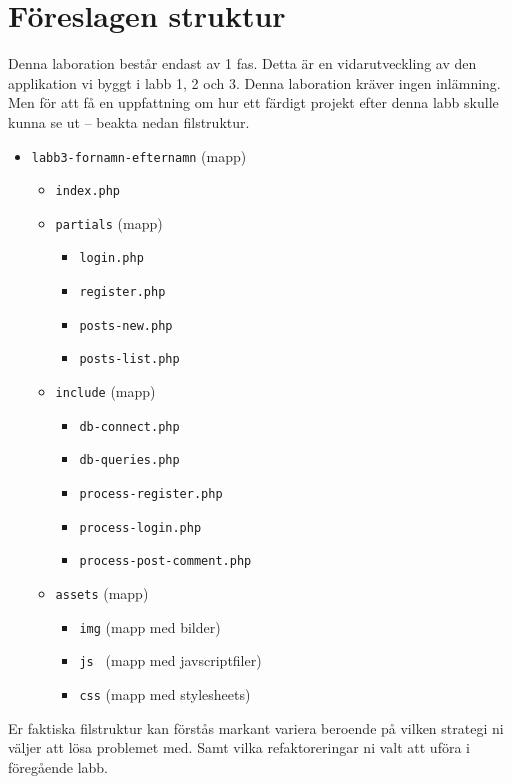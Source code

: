 \documentclass[12pt]{article}
\begin{document}
\section{Föreslagen struktur}
Denna laboration består endast av 1 fas. Detta är en vidarutveckling av den applikation vi byggt i labb 1, 2 och 3. Denna laboration kräver ingen inlämning. Men för att få en uppfattning om hur ett färdigt projekt efter denna labb skulle kunna se ut -- beakta nedan filstruktur.
\begin{itemize}
  \item \texttt{labb3-fornamn-efternamn} (mapp)
  \begin{itemize}
    \item \texttt{index.php}
    \item \texttt{partials} (mapp)
      \begin{itemize}
        \item \texttt{login.php}
        \item \texttt{register.php}
        \item \texttt{posts-new.php}
        \item \texttt{posts-list.php}
      \end{itemize}
    \item \texttt{include} (mapp)
      \begin{itemize}
        \item \texttt{db-connect.php}
        \item \texttt{db-queries.php}
        \item \texttt{process-register.php}
        \item \texttt{process-login.php}
        \item \texttt{process-post-comment.php}
      \end{itemize}
    \item \texttt{assets} (mapp)
    \begin{itemize}
      \item \texttt{img} (mapp med bilder)
      \item \texttt{js } (mapp med javscriptfiler)
      \item \texttt{css} (mapp med stylesheets)
    \end{itemize}
  \end{itemize}
\end{itemize}

Er faktiska filstruktur kan förstås markant variera beroende på vilken strategi ni väljer att lösa problemet med. Samt vilka refaktoreringar ni valt att uföra i föregående labb.
\end{document}
